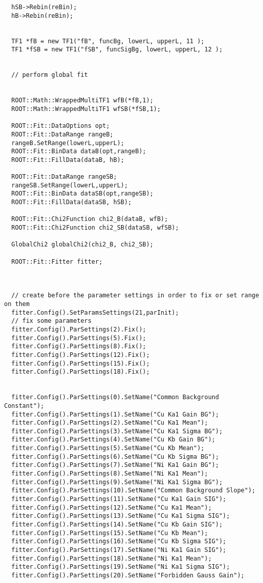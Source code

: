 \begin{appendices}
\begin{lstlisting}
  hSB->Rebin(reBin);
  hB->Rebin(reBin);
  

  TF1 *fB = new TF1("fB", funcBg, lowerL, upperL, 11 );
  TF1 *fSB = new TF1("fSB", funcSigBg, lowerL, upperL, 12 );
  

  // perform global fit 


  ROOT::Math::WrappedMultiTF1 wfB(*fB,1);
  ROOT::Math::WrappedMultiTF1 wfSB(*fSB,1);

  ROOT::Fit::DataOptions opt; 
  ROOT::Fit::DataRange rangeB; 
  rangeB.SetRange(lowerL,upperL); 
  ROOT::Fit::BinData dataB(opt,rangeB); 
  ROOT::Fit::FillData(dataB, hB); 

  ROOT::Fit::DataRange rangeSB; 
  rangeSB.SetRange(lowerL,upperL);
  ROOT::Fit::BinData dataSB(opt,rangeSB); 
  ROOT::Fit::FillData(dataSB, hSB);

  ROOT::Fit::Chi2Function chi2_B(dataB, wfB); 
  ROOT::Fit::Chi2Function chi2_SB(dataSB, wfSB);

  GlobalChi2 globalChi2(chi2_B, chi2_SB);

  ROOT::Fit::Fitter fitter;

  

  // create before the parameter settings in order to fix or set range on them
  fitter.Config().SetParamsSettings(21,parInit); 
  // fix some parameters 
  fitter.Config().ParSettings(2).Fix();
  fitter.Config().ParSettings(5).Fix();
  fitter.Config().ParSettings(8).Fix();
  fitter.Config().ParSettings(12).Fix();
  fitter.Config().ParSettings(15).Fix();
  fitter.Config().ParSettings(18).Fix();
  
  
  fitter.Config().ParSettings(0).SetName("Common Background Constant");
  fitter.Config().ParSettings(1).SetName("Cu Ka1 Gain BG");
  fitter.Config().ParSettings(2).SetName("Cu Ka1 Mean");
  fitter.Config().ParSettings(3).SetName("Cu Ka1 Sigma BG");
  fitter.Config().ParSettings(4).SetName("Cu Kb Gain BG");
  fitter.Config().ParSettings(5).SetName("Cu Kb Mean");
  fitter.Config().ParSettings(6).SetName("Cu Kb Sigma BG");
  fitter.Config().ParSettings(7).SetName("Ni Ka1 Gain BG");
  fitter.Config().ParSettings(8).SetName("Ni Ka1 Mean");
  fitter.Config().ParSettings(9).SetName("Ni Ka1 Sigma BG");
  fitter.Config().ParSettings(10).SetName("Common Background Slope");
  fitter.Config().ParSettings(11).SetName("Cu Ka1 Gain SIG");
  fitter.Config().ParSettings(12).SetName("Cu Ka1 Mean");
  fitter.Config().ParSettings(13).SetName("Cu Ka1 Sigma SIG");
  fitter.Config().ParSettings(14).SetName("Cu Kb Gain SIG");
  fitter.Config().ParSettings(15).SetName("Cu Kb Mean");
  fitter.Config().ParSettings(16).SetName("Cu Kb Sigma SIG");
  fitter.Config().ParSettings(17).SetName("Ni Ka1 Gain SIG");
  fitter.Config().ParSettings(18).SetName("Ni Ka1 Mean");
  fitter.Config().ParSettings(19).SetName("Ni Ka1 Sigma SIG");
  fitter.Config().ParSettings(20).SetName("Forbidden Gauss Gain"); 
 

\end{lstlisting}
\end{appendices}
